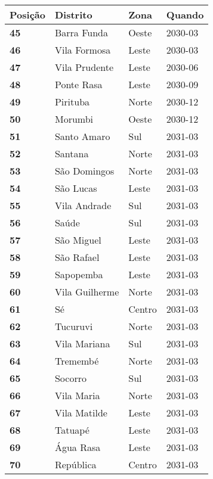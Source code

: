 \begin{table}[H]
	\centering
	\begin{tabular}{l|l|l|l}
		\textbf{Posição} & \textbf{Distrito} & \textbf{Zona} & \textbf{Quando} \\ \hline
		\textbf{45} & Barra Funda & Oeste & 2030-03\\ \hline
		\textbf{46} & Vila Formosa & Leste & 2030-03\\ \hline
		\textbf{47} & Vila Prudente & Leste & 2030-06\\ \hline
		\textbf{48} & Ponte Rasa & Leste & 2030-09\\ \hline
		\textbf{49} & Pirituba & Norte & 2030-12\\ \hline
		\textbf{50} & Morumbi & Oeste & 2030-12\\ \hline
		\textbf{51} & Santo Amaro & Sul & 2031-03\\ \hline
		\textbf{52} & Santana & Norte & 2031-03\\ \hline
		\textbf{53} & São Domingos & Norte & 2031-03\\ \hline
		\textbf{54} & São Lucas & Leste & 2031-03\\ \hline
		\textbf{55} & Vila Andrade & Sul & 2031-03\\ \hline
		\textbf{56} & Saúde & Sul & 2031-03\\ \hline
		\textbf{57} & São Miguel & Leste & 2031-03\\ \hline
		\textbf{58} & São Rafael & Leste & 2031-03\\ \hline
		\textbf{59} & Sapopemba & Leste & 2031-03\\ \hline
		\textbf{60} & Vila Guilherme & Norte & 2031-03\\ \hline
		\textbf{61} & Sé & Centro & 2031-03\\ \hline
		\textbf{62} & Tucuruvi & Norte & 2031-03\\ \hline
		\textbf{63} & Vila Mariana & Sul & 2031-03\\ \hline
		\textbf{64} & Tremembé & Norte & 2031-03\\ \hline
		\textbf{65} & Socorro & Sul & 2031-03\\ \hline
		\textbf{66} & Vila Maria & Norte & 2031-03\\ \hline
		\textbf{67} & Vila Matilde & Leste & 2031-03\\ \hline
		\textbf{68} & Tatuapé & Leste & 2031-03\\ \hline
		\textbf{69} & Água Rasa & Leste & 2031-03\\ \hline
		\textbf{70} & República & Centro & 2031-03\\ \hline

\end{tabular}
\end{table}
